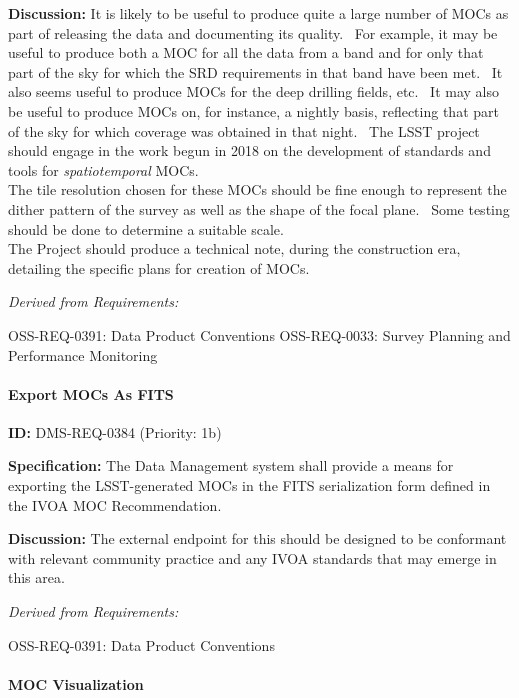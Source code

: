 \documentclass[SE,toc,lsstdraft]{lsstdoc}
\begin{document}
\textbf{Discussion:}
It is likely to be useful to produce quite a large number of MOCs as part of releasing the data and documenting its quality.  For example, it may be useful to produce both a MOC for all the data from a band and for only that part of the sky for which the SRD requirements in that band have been met.  It also seems useful to produce MOCs for the deep drilling fields, etc.  It may also be useful to produce MOCs on, for instance, a nightly basis, reflecting that part of the sky for which coverage was obtained in that night.  The LSST project should engage in the work begun in 2018 on the development of standards and tools for \textit{spatiotemporal} MOCs.
\\
The tile resolution chosen for these MOCs should be fine enough to represent the dither pattern of the survey as well as the shape of the focal plane.  Some testing should be done to determine a suitable scale.
\\
The Project should produce a technical note, during the construction era, detailing the specific plans for creation of MOCs.

\emph{Derived from Requirements:}

OSS-REQ-0391:
Data Product Conventions \newline
OSS-REQ-0033:
Survey Planning and Performance Monitoring \newline

\paragraph{Export MOCs As FITS}\hfill  %

\label{DMS-REQ-0384}
\textbf{ID:} DMS-REQ-0384 (Priority: 1b)

\textbf{Specification:}
The Data Management system shall provide a means for exporting the LSST-generated MOCs in the FITS serialization form defined in the IVOA MOC Recommendation.

\textbf{Discussion:}
The external endpoint for this should be designed to be conformant with relevant community practice and any IVOA standards that may emerge in this area.

\emph{Derived from Requirements:}

OSS-REQ-0391:
Data Product Conventions \newline

\paragraph{MOC Visualization}\hfill  %
\end{document}
